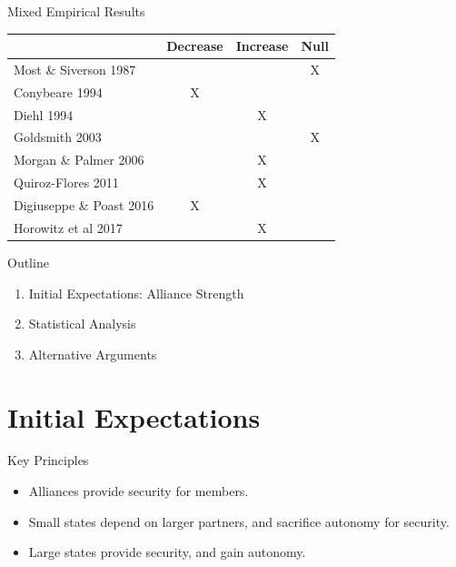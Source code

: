 \documentclass{beamer}
\begin{document}

\begin{frame}{Mixed Empirical Results}


\begin{table}[hbt!]
\begin{center}
\begin{tabular}{lccc}
     & Decrease & Increase & Null \\
\hline
Most \& Siverson 1987  &  &  & X \\
Conybeare 1994 & X & &  \\
Diehl 1994 &  & X &  \\
Goldsmith 2003 &  &  & X \\
Morgan \& Palmer 2006 &  & X & \\ 
Quiroz-Flores 2011 &  & X &  \\ 
Digiuseppe \& Poast 2016 & X &  & \\ 
Horowitz et al 2017 &  & X & \\ 
\hline
\end{tabular}
\end{center} 
\end{table}



 \end{frame}


\begin{frame}{Outline}

\begin{enumerate}
\item Initial Expectations: Alliance Strength
\pause
\item Statistical Analysis
\pause
\item Alternative Arguments
\end{enumerate}


\end{frame}


\section{Initial Expectations}


\begin{frame}{Key Principles}

\begin{itemize}
\item Alliances provide security for members.  
\pause
\item Small states depend on larger partners, and sacrifice autonomy for security.
\pause
\item Large states provide security, and gain autonomy. 
\end{itemize}



\end{frame}
\end{document}
